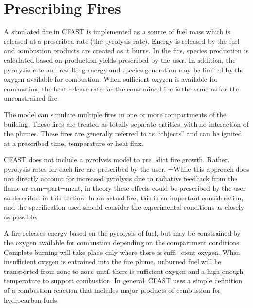 \section{Prescribing Fires}

A simulated fire in CFAST is implemented as a source of fuel mass which is released at a prescribed rate (the pyrolysis rate). Energy is released by the fuel and combustion products are created as it burns. In the fire, species production is calculated based on production yields prescribed by the user. In addition, the pyrolysis rate and resulting energy and species generation may be limited by the oxygen available for combustion. When sufficient oxygen is available for combustion, the heat release rate for the constrained fire is the same as for the unconstrained fire.

The model can simulate multiple fires in one or more compartments of the building.  These fires are treated as totally separate entities, with no interaction of the plumes. These fires are generally referred to as “objects” and can be ignited at a prescribed time, temperature or heat flux.

CFAST does not include a pyrolysis model to pre¬dict fire growth. Rather, pyrolysis rates for each fire are prescribed by the user.  ¬While this approach does not directly account for increased pyrolysis due to radiative feedback from the flame or com¬part¬ment, in theory these effects could be prescribed by the user as described in this section.  In an actual fire, this is an important consideration, and the specification used should consider the experimental conditions as closely as possible.

A fire releases energy based on the pyrolysis of fuel, but may be constrained by the oxygen available for combustion depending on the compartment conditions. Complete burning will take place only where there is suffi¬cient oxygen.  When insufficient oxygen is entrained into the fire plume, unburned fuel will be transported from zone to zone until there is sufficient oxygen and a high enough temperature to support combustion.  In general, CFAST uses a simple definition of a combustion reaction that includes major products of combustion for hydrocarbon fuels:

